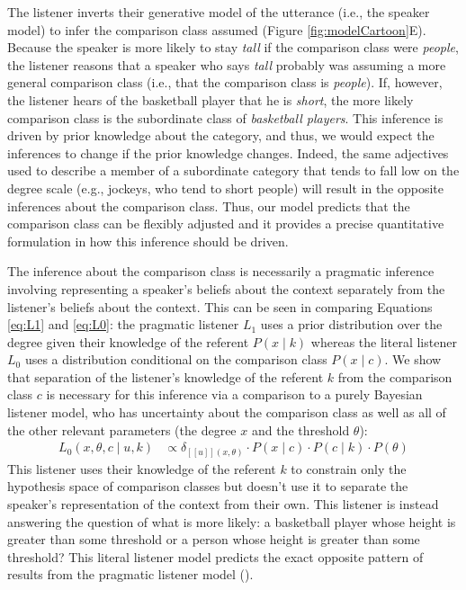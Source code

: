 \documentclass[doc]{apa6}
\begin{document}
The listener inverts their generative model of the utterance (i.e., the speaker model) to infer the comparison class assumed (Figure \ref{fig:modelCartoon}E).
Because the speaker is more likely to stay \emph{tall} if the comparison class were \emph{people}, the listener reasons that a speaker who says \emph{tall} probably was assuming a more general comparison class (i.e., that the comparison class is \emph{people}). 
If, however, the listener hears of the basketball player that he is \emph{short}, the more likely comparison class is the subordinate class of \emph{basketball players}.
This inference is driven by prior knowledge about the category, and thus, we would expect the inferences to change if the prior knowledge changes.
Indeed, the same adjectives used to describe a member of a subordinate category that tends to fall low on the degree scale (e.g., jockeys, who tend to short people) will result in the opposite inferences about the comparison class. 
Thus, our model predicts that the comparison class can be flexibly adjusted and it provides a precise quantitative formulation in how this inference should be driven. 

The inference about the comparison class is necessarily a pragmatic inference involving representing a speaker's beliefs about the context separately from the listener's beliefs about the context. 
This can be seen in comparing Equations \ref{eq:L1} and \ref{eq:L0}: the pragmatic listener $L_1$ uses a prior distribution over the degree given their knowledge of the referent $P(x \mid k)$ whereas the literal listener $L_0$ uses a distribution conditional on the comparison class $P(x \mid c)$. 
We show that separation of the listener's knowledge of the referent $k$ from the comparison class $c$ is necessary for this inference via a comparison to a purely Bayesian listener model, who has uncertainty about the comparison class as well as all of the other relevant parameters (the degree $x$ and the threshold $\theta$): 
%
  \begin{align}
L_{0}(x, \theta, c \mid u, k) &\propto \delta_{[\![u]\!](x, \theta)} \cdot P(x \mid c) \cdot P(c \mid k) \cdot P(\theta) \label{eq:L0alt}
\end{align}
%
This listener uses their knowledge of the referent $k$ to constrain only the hypothesis space of comparison classes but doesn't use it to separate the speaker's representation of the context from their own. 
This listener is instead answering the question of what is more likely: a basketball player whose height is greater than some threshold or a person whose height is greater than some threshold? This literal listener model predicts the exact opposite pattern of results from the pragmatic listener model (). 
  
\end{document}
